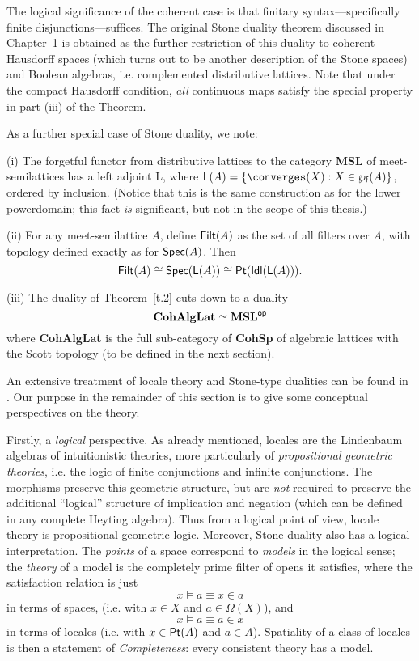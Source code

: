 The logical significance of the coherent case is that finitary syntax---specifically finite disjunctions---suffices.
The original Stone duality theorem discussed in Chapter~1 is obtained as the further  restriction of this duality to coherent Hausdorff spaces (which turns out to be another description of the Stone spaces) and Boolean algebras, i.e. complemented distributive lattices.
Note that under the compact Hausdorff condition, {\em all} continuous maps satisfy the special property in part (iii) of the Theorem.

As a further special case of Stone duality, we note:
\begin{theorem}
\label{msl}
(i) The forgetful functor from distributive lattices to the category {\bf MSL} of meet-semilattices has a left adjoint {\sf L}, where ${\sf L}(A) = \{ \converges(X) : X \in \wp_{\sf f}(A) \}$, ordered by inclusion. 
(Notice that this is the same construction as for the lower powerdomain; this fact {\em is} significant, but not in the scope of this thesis.)

\noindent (ii) For any meet-semilattice $A$, define ${\sf Filt}(A)$ as 
the set of all filters over $A$, with topology defined exactly as for ${\sf Spec}(A)$. Then
\[ {\sf Filt}(A) \cong {\sf Spec}({\sf L}(A)) \cong {\sf Pt}({\sf Idl}({\sf L}(A))). \]

\noindent (iii) The duality of Theorem~\ref{t.2} cuts down to a duality
\[ {\bf CohAlgLat} \simeq {\bf MSL}^{\sf op} \]
where {\bf CohAlgLat} is the full sub-category of {\bf CohSp} of algebraic 
lattices with the Scott topology (to be defined in the next section).
\end{theorem}

An extensive treatment of locale theory and Stone-type dualities can be found in \cite{Joh82}.
Our purpose in the remainder of this section is to give some conceptual perspectives on the theory.

Firstly, a {\em logical} perspective.
As already mentioned, locales are the Lindenbaum algebras of intuitionistic theories, more particularly of {\em propositional geometric theories}, i.e. the logic of finite conjunctions and infinite conjunctions.
The morphisms preserve this geometric structure, but are {\em not} required to preserve the additional ``logical'' structure of implication and negation (which can be defined in any complete Heyting algebra).
Thus from a logical point of view, locale theory is propositional geometric logic.
Moreover, Stone duality also has a logical interpretation.
The {\em points} of a space correspond to {\em models} in the logical sense; the {\em theory} of a model is the completely prime filter of opens it satisfies, where the satisfaction relation is just
\[ x \models a \equiv x \in a \]
in terms of spaces, (i.e. with $x \in X$ and $a \in \Omega (X)$), and
\[ x \models a \equiv a \in x \]
in terms of locales (i.e. with $x \in {\sf Pt}(A)$ and $a \in A$).
Spatiality of a class of locales is then a statement of {\em Completeness}: every consistent theory has a model.

